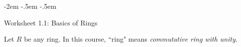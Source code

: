 \documentclass[12pt]{amsart}
\begin{document}
	\thispagestyle{empty}\kern -2em
\kern -.5em
\kern -.5em

\bigskip
	
\begin{center}
	{\Large Worksheet 1.1: Basics of Rings}
\end{center}


\medskip

\noindent	 Let $R$ be any ring.  In this course, ``ring" means  {\it commutative ring with unity}.

\medskip

	\noindent	 \hrulefill 
	
\end{document}
